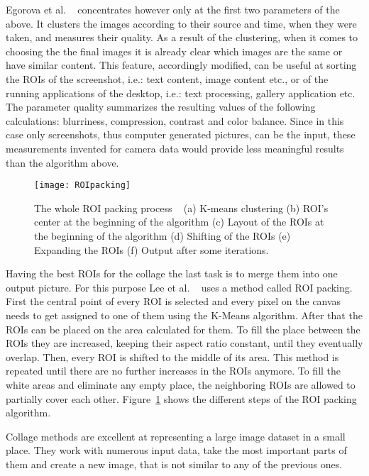 \documentclass[draft,final]{vutinfth} %
\begin{document}
	Egorova et al. ~\cite{egorova2008collage} concentrates however only at the first two parameters of the above.
	It clusters the images according to their source and time, when they were taken, and measures their quality.
	As a result of the clustering, when it comes to choosing the the final images it is already clear  which images are the same or have similar content.
	This feature, accordingly modified, can be useful at sorting the ROIs of the screenshot, i.e.: text content, image content etc., or of the running applications of the desktop, i.e.: text processing, gallery application etc.
	The parameter quality summarizes the resulting values of the following calculations: blurriness, compression, contrast and color balance.
	Since in this case only screenshots, thus computer generated pictures, can be the input, these measurements invented for camera data would provide less meaningful results than the algorithm above.\par 
	\begin{figure}[H]
		\centering		
		\texttt{[image: ROIpacking]}
		\caption{The whole ROI packing process ~\cite{lee2010mobile} (a) K-means clustering (b) ROI's center at the beginning of the algorithm (c) Layout of the ROIs at the beginning of the algorithm (d) Shifting of the ROIs (e) Expanding the ROIs (f) Output after some iterations.}
		\label{fig:ROIpacking}
	\end{figure}
	Having the best ROIs for the collage the last task is to merge them into one output picture.
	For this purpose Lee et al. ~\cite{lee2010mobile} uses a method called ROI packing.
	First the central point of every ROI is selected and every pixel on the canvas needs to get assigned to one of them using the K-Means algorithm.
	After that the ROIs can be placed on the area calculated for them.
	To fill the place between the ROIs they are increased, keeping their aspect ratio constant, until they eventually overlap. 
	Then, every ROI is shifted to the middle of its area.
	This method is repeated until there are no further increases in the ROIs anymore.
	To fill the white areas and eliminate any empty place, the neighboring ROIs are allowed to partially cover each other.
	Figure~\ref{fig:ROIpacking} shows the different steps of the ROI packing algorithm.\par 
	Collage methods are excellent at representing a large image dataset in a small place.
	They work with numerous input data, take the most important parts of them and create a new image, that is not similar to any of the previous ones.
\end{document}
